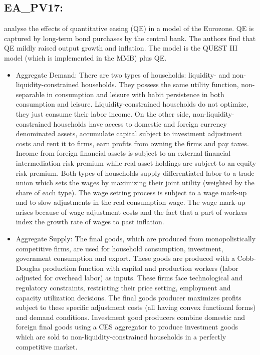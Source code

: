 \documentclass[11pt,a4paper]{article}
\begin{document}
	\subsection{EA\_PV17: \cite{priftis2017macroecon}}
	\label{EAPV17}
	\cite{priftis2017macroecon} analyse the effects of quantitative easing (QE) in a  model of the Eurozone. QE is captured by long-term bond purchases by the central bank. The authors find that QE mildly raised output growth and inflation. The model is the QUEST III model (which is implemented in the MMB) plus QE.
	\begin{itemize}
		\item Aggregate  Demand:  There are two types of households: liquidity- and non-liquidity-constrained households. They possess the same utility function, non-separable in consumption and leisure with habit persistence in both consumption and leisure. Liquidity-constrained households do not optimize, they just consume their labor income. On the other side, non-liquidity-constrained households have access to domestic and foreign currency denominated assets, accumulate capital subject to investment adjustment costs and rent it to firms, earn profits from owning the firms and pay taxes. Income from foreign financial assets is subject to an external financial intermediation risk premium while real asset holdings are subject to an equity risk premium. Both types of households supply differentiated labor to a trade union which sets the wages by maximizing their joint utility (weighted by the share of each type). The wage setting process is subject to a wage mark-up and to slow adjustments in the real consumption wage. The wage mark-up arises because of wage adjustment costs and the fact that a part of workers index the growth rate of wages to past inflation.
		\item Aggregate  Supply:  The final goods, which are produced from monopolistically competitive firms, are used for household consumption, investment, government consumption and export. These goods are produced with a Cobb-Douglas production function with capital and production workers (labor adjusted for overhead labor) as inputs. These firms face technological and regulatory constraints, restricting their price setting, employment and capacity utilization decisions. The final goods producer maximizes profits subject to these specific adjustment costs (all having convex functional forms) and demand conditions. Investment good producers combine domestic and foreign final goods using a CES aggregator to produce investment goods which
		are sold to non-liquidity-constrained households in a perfectly competitive market.

\end{itemize}
\end{document}
